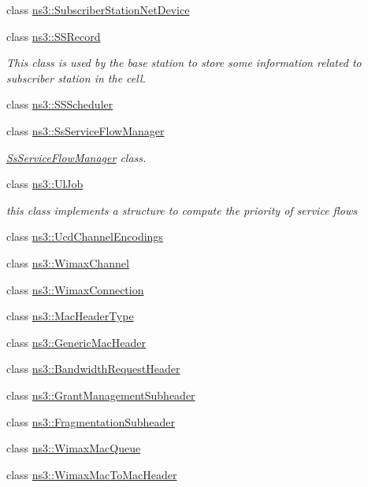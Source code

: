 \begin{DoxyCompactItemize}
class \hyperlink{classns3_1_1SubscriberStationNetDevice}{ns3\+::\+Subscriber\+Station\+Net\+Device}
\item 
class \hyperlink{classns3_1_1SSRecord}{ns3\+::\+S\+S\+Record}
\begin{DoxyCompactList}\small\item\em This class is used by the base station to store some information related to subscriber station in the cell. \end{DoxyCompactList}\item 
class \hyperlink{classns3_1_1SSScheduler}{ns3\+::\+S\+S\+Scheduler}
\item 
class \hyperlink{classns3_1_1SsServiceFlowManager}{ns3\+::\+Ss\+Service\+Flow\+Manager}
\begin{DoxyCompactList}\small\item\em \hyperlink{classns3_1_1SsServiceFlowManager}{Ss\+Service\+Flow\+Manager} class. \end{DoxyCompactList}\item 
class \hyperlink{classns3_1_1UlJob}{ns3\+::\+Ul\+Job}
\begin{DoxyCompactList}\small\item\em this class implements a structure to compute the priority of service flows \end{DoxyCompactList}\item 
class \hyperlink{classns3_1_1UcdChannelEncodings}{ns3\+::\+Ucd\+Channel\+Encodings}
\item 
class \hyperlink{classns3_1_1WimaxChannel}{ns3\+::\+Wimax\+Channel}
\item 
class \hyperlink{classns3_1_1WimaxConnection}{ns3\+::\+Wimax\+Connection}
\item 
class \hyperlink{classns3_1_1MacHeaderType}{ns3\+::\+Mac\+Header\+Type}
\item 
class \hyperlink{classns3_1_1GenericMacHeader}{ns3\+::\+Generic\+Mac\+Header}
\item 
class \hyperlink{classns3_1_1BandwidthRequestHeader}{ns3\+::\+Bandwidth\+Request\+Header}
\item 
class \hyperlink{classns3_1_1GrantManagementSubheader}{ns3\+::\+Grant\+Management\+Subheader}
\item 
class \hyperlink{classns3_1_1FragmentationSubheader}{ns3\+::\+Fragmentation\+Subheader}
\item 
class \hyperlink{classns3_1_1WimaxMacQueue}{ns3\+::\+Wimax\+Mac\+Queue}
\item 
class \hyperlink{classns3_1_1WimaxMacToMacHeader}{ns3\+::\+Wimax\+Mac\+To\+Mac\+Header}

\end{DoxyCompactItemize}
